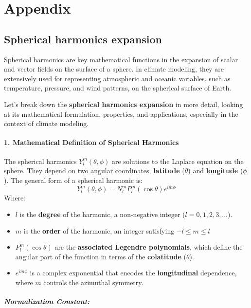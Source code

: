 \chapter{Appendix}\label{ch:appendixA}
\section{Spherical harmonics expansion}

Spherical harmonics are key mathematical functions in the expansion of scalar and vector fields on the surface of a sphere. In climate modeling, they are extensively used for representing atmospheric and oceanic variables, such as temperature, pressure, and wind patterns, on the spherical surface of Earth.


Let's break down the \textbf{spherical harmonics expansion} in more detail, looking at its mathematical formulation, properties, and applications, especially in the context of climate modeling.

\subsubsection{1. \textbf{Mathematical Definition of Spherical Harmonics}}

The spherical harmonics $Y_l^m(\theta, \phi)$ are solutions to the Laplace equation on the sphere. They depend on two angular coordinates, \textbf{latitude} ($\theta$) and \textbf{longitude} ($\phi$).
The general form of a spherical harmonic is:
$$Y_l^m(\theta,\phi)=N_l^mP_l^m(\cos\theta)e^{im\phi}$$
Where:
\begin{itemize}
    \item $l$ is the \textbf{degree} of the harmonic, a non-negative integer ($l=0,1,2,3,…$).
    \item  $m$ is the \textbf{order} of the harmonic, an integer satisfying $-l\leq m\leq l$  
    \item $P_l^m(\cos\theta)$ are the \textbf{associated Legendre polynomials}, which define the angular part of the function in terms of the \textbf{colatitude} ($\theta$).
    \item $e^{im\phi}$ is a complex exponential that encodes the \textbf{longitudinal} dependence, where $m$ controls the azimuthal symmetry.
\end{itemize}

\paragraph{\textbf{Normalization Constant}:}

